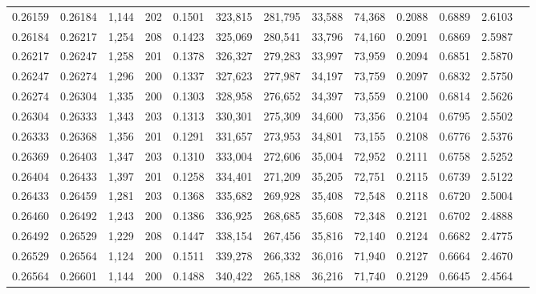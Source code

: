\begin{tabular}{rrrrrrrrrrrrr}
0.26159 & 0.26184 & 1,144 & 202 &                                     0.1501 & 323,815 & 281,795 &  33,588 &  74,368 & 0.2088 & 0.6889 & 2.6103 \\
0.26184 & 0.26217 & 1,254 & 208 &                                     0.1423 & 325,069 & 280,541 &  33,796 &  74,160 & 0.2091 & 0.6869 & 2.5987 \\
0.26217 & 0.26247 & 1,258 & 201 &                                     0.1378 & 326,327 & 279,283 &  33,997 &  73,959 & 0.2094 & 0.6851 & 2.5870 \\
0.26247 & 0.26274 & 1,296 & 200 &                                     0.1337 & 327,623 & 277,987 &  34,197 &  73,759 & 0.2097 & 0.6832 & 2.5750 \\
0.26274 & 0.26304 & 1,335 & 200 &                                     0.1303 & 328,958 & 276,652 &  34,397 &  73,559 & 0.2100 & 0.6814 & 2.5626 \\
0.26304 & 0.26333 & 1,343 & 203 &                                     0.1313 & 330,301 & 275,309 &  34,600 &  73,356 & 0.2104 & 0.6795 & 2.5502 \\
0.26333 & 0.26368 & 1,356 & 201 &                                     0.1291 & 331,657 & 273,953 &  34,801 &  73,155 & 0.2108 & 0.6776 & 2.5376 \\
0.26369 & 0.26403 & 1,347 & 203 &                                     0.1310 & 333,004 & 272,606 &  35,004 &  72,952 & 0.2111 & 0.6758 & 2.5252 \\
0.26404 & 0.26433 & 1,397 & 201 &                                     0.1258 & 334,401 & 271,209 &  35,205 &  72,751 & 0.2115 & 0.6739 & 2.5122 \\
0.26433 & 0.26459 & 1,281 & 203 &                                     0.1368 & 335,682 & 269,928 &  35,408 &  72,548 & 0.2118 & 0.6720 & 2.5004 \\
0.26460 & 0.26492 & 1,243 & 200 &                                     0.1386 & 336,925 & 268,685 &  35,608 &  72,348 & 0.2121 & 0.6702 & 2.4888 \\
0.26492 & 0.26529 & 1,229 & 208 &                                     0.1447 & 338,154 & 267,456 &  35,816 &  72,140 & 0.2124 & 0.6682 & 2.4775 \\
0.26529 & 0.26564 & 1,124 & 200 &                                     0.1511 & 339,278 & 266,332 &  36,016 &  71,940 & 0.2127 & 0.6664 & 2.4670 \\
0.26564 & 0.26601 & 1,144 & 200 &                                     0.1488 & 340,422 & 265,188 &  36,216 &  71,740 & 0.2129 & 0.6645 & 2.4564 \\

\end{tabular}
